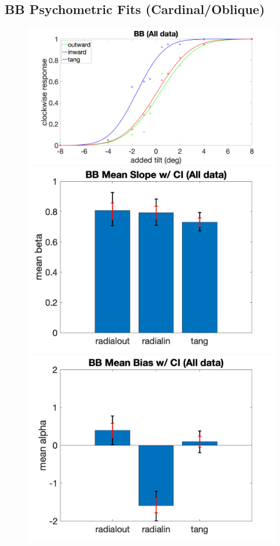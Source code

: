 \documentclass[11pt]{article} %
\begin{document}
\subsection{BB Psychometric Fits (Cardinal/Oblique)}
\begin{figure}[H]
\centering %
\includegraphics[scale=.06]{Images/PF_BB_allcond.png}
\includegraphics[scale=.11]{Images/MeanSlopeError_ci_BB_allcond.png}
\includegraphics[scale=.11]{Images/MeanBiasError_ci_BB_allcond.png}

\end{figure}
\end{document}
